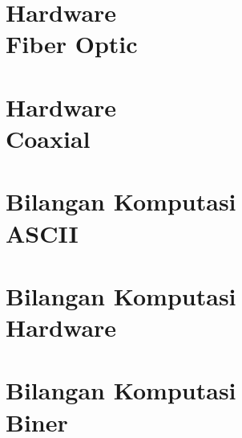 \documentclass{WileySix}
\begin{document}
\chapter[Fiber Optic]
{Hardware\\ Fiber Optic}



\chapter[Coaxial]
{Hardware\\ Coaxial}


%

\chapter[Bilangan Komputasi ASCII]
{Bilangan Komputasi\\ ASCII}


%

%

\chapter[Cara kerja hardware]
{Bilangan Komputasi\\ Hardware}


\chapter[Bilangan Komputasi Biner]
{Bilangan Komputasi\\ Biner}

\end{document}
